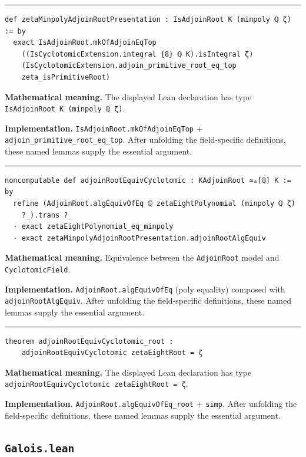 \documentclass[UTF8,a4paper,11pt,fontset=fandol]{ctexart}
\theoremstyle{definition}
\newcommand{\statementsep}{\par\medskip\hrule\medskip}
\begin{document}
\statementsep
\begin{verbatim}
def zetaMinpolyAdjoinRootPresentation : IsAdjoinRoot K (minpoly ℚ ζ) := by
  exact IsAdjoinRoot.mkOfAdjoinEqTop
    ((IsCyclotomicExtension.integral {8} ℚ K).isIntegral ζ)
    (IsCyclotomicExtension.adjoin_primitive_root_eq_top
    zeta_isPrimitiveRoot)
\end{verbatim}
\noindent\textbf{Mathematical meaning.} The displayed Lean declaration has type \texttt{IsAdjoinRoot K (minpoly ℚ ζ)}.\par
\noindent\textbf{Implementation.} \texttt{IsAdjoinRoot.\allowbreak{}mkOfAdjoinEqTop} + \texttt{adjoin\_\allowbreak{}primitive\_\allowbreak{}root\_\allowbreak{}eq\_\allowbreak{}top}. After unfolding the field-specific definitions, these named lemmas supply the essential argument.\par
\statementsep
\begin{verbatim}
noncomputable def adjoinRootEquivCyclotomic : KAdjoinRoot ≃ₐ[ℚ] K := by
  refine (AdjoinRoot.algEquivOfEq ℚ zetaEightPolynomial (minpoly ℚ ζ)
    ?_).trans ?_
  · exact zetaEightPolynomial_eq_minpoly
  · exact zetaMinpolyAdjoinRootPresentation.adjoinRootAlgEquiv
\end{verbatim}
\noindent\textbf{Mathematical meaning.} Equivalence between the \texttt{AdjoinRoot} model and \texttt{CyclotomicField}.\par
\noindent\textbf{Implementation.} \texttt{AdjoinRoot.\allowbreak{}algEquivOfEq} (poly equality) composed with \texttt{adjoinRootAlgEquiv}. After unfolding the field-specific definitions, these named lemmas supply the essential argument.\par
\statementsep
\begin{verbatim}
theorem adjoinRootEquivCyclotomic_root :
    adjoinRootEquivCyclotomic zetaEightRoot = ζ
\end{verbatim}
\noindent\textbf{Mathematical meaning.} The displayed Lean declaration has type \texttt{adjoinRootEquivCyclotomic zetaEightRoot = ζ}.\par
\noindent\textbf{Implementation.} \texttt{AdjoinRoot.\allowbreak{}algEquivOfEq\_\allowbreak{}root} + \texttt{simp}. After unfolding the field-specific definitions, these named lemmas supply the essential argument.\par

\subsection{\texttt{Galois.lean}}
\end{document}
